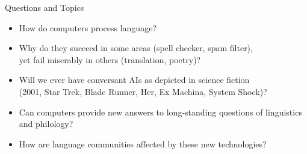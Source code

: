 \documentclass[professionalfonts, xcolor={usenames,svgnames,x11names,table}]{beamer}
\begin{document}
\begin{frame}{Questions and Topics}
    \begin{itemize}
        \item How do computers process language?
        \item Why do they succeed in some areas (spell checker, spam filter),\\
            yet fail miserably in others (translation, poetry)?
        \item Will we ever have conversant AIs as depicted in science fiction\\
            (2001, Star Trek, Blade Runner, Her, Ex Machina, System Shock)?
        \item Can computers provide new answers to long-standing questions of linguistics and philology?
        \item How are language communities affected by these new technologies?
    \end{itemize}
\end{frame}
\end{document}
